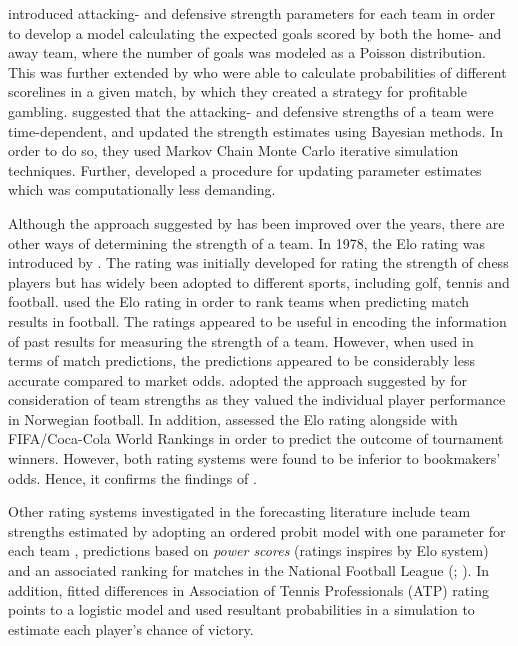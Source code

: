 \newpar

\cite{Maher} introduced attacking- and defensive strength parameters for each team in order to develop a model calculating the expected goals scored by both the home- and away team, where the number of goals was modeled as a Poisson distribution. This was further extended by \cite{Dixon} who were able to calculate probabilities of different scorelines in a given match, by which they created a strategy for profitable gambling. \cite{Rue} suggested that the attacking- and defensive strengths of a team were time-dependent, and updated the strength estimates using Bayesian methods. In order to do so, they used Markov Chain Monte Carlo iterative simulation techniques. Further, \cite{Crowder} developed a procedure for updating parameter estimates which was computationally less demanding.



\newpar

Although the approach suggested by \cite{Maher} has been improved over the years, there are other ways of determining the strength of a team. In 1978, the Elo rating was introduced by \cite{Elo}. The rating was initially developed for rating the strength of chess players but has widely been adopted to different sports, including golf, tennis and football. \cite{Hvattum} used the Elo rating in order to rank teams when predicting match results in football. The ratings appeared to be useful in encoding the information of past results for measuring the strength of a team. However, when used in terms of match predictions, the predictions appeared to be considerably less accurate compared to market odds. \cite{vabo} adopted the approach suggested by \cite{Hvattum} for consideration of team strengths as they valued the individual player performance in Norwegian football. In addition, \cite{Leitner} assessed the Elo rating alongside with FIFA/Coca-Cola World Rankings \citep{FIFA} in order to predict the outcome of tournament winners. However, both rating systems were found to be inferior to bookmakers' odds. Hence, it confirms the findings of \cite{Hvattum}.

\newpar

Other rating systems investigated in the forecasting literature include team strengths estimated by adopting an ordered probit model with one parameter for each team \citep{Graham}, predictions based on \textit{power scores} (ratings inspires by Elo system) and an associated ranking for matches in the National Football League (\citep{Boulier}; \citep{Amundson}). In addition, \cite{Clarke_2} fitted differences in Association of Tennis Professionals (ATP) rating points to a logistic model and used resultant probabilities in a simulation to estimate each player's chance of victory. 

